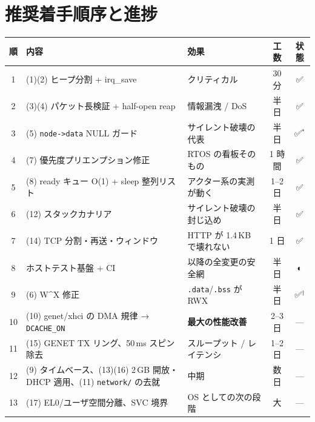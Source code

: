 \documentclass[a4paper,11pt]{ltjsarticle}
\begin{document}
\section{推奨着手順序と進捗}

\begin{center}\small
\begin{longtable}{@{}c p{7.2cm} p{3.0cm} c c@{}}
\toprule
\textbf{順} & \textbf{内容} & \textbf{効果} & \textbf{工数} & \textbf{状態}\\ \midrule
\endhead
1  & (1)(2) ヒープ分割 + irq\_save                       & クリティカル            & 30 分   & ✅\\
2  & (3)(4) パケット長検証 + half-open reap              & 情報漏洩 / DoS          & 半日    & ✅\\
3  & (5) \texttt{node->data} NULL ガード                 & サイレント破壊の代表    & 半日    & ✅$^{*}$\\
4  & (7) 優先度プリエンプション修正                      & RTOS の看板そのもの     & 1 時間  & ✅\\
5  & (8) ready キュー O(1) + sleep 整列リスト            & アクター系の実測が動く  & 1--2 日 & ✅\\
6  & (12) スタックカナリア                               & サイレント破壊の封じ込め& 半日    & ✅\\
7  & (14) TCP 分割・再送・ウィンドウ                     & HTTP が 1.4\,KB で壊れない & 1 日 & ✅\\
8  & ホストテスト基盤 + CI                               & 以降の全変更の安全網    & 半日    & ◐\\
9  & (6) W\textasciicircum X 修正                        & \texttt{.data}/\texttt{.bss} が RWX & 半日 & ✅$^{\dagger}$\\
10 & (10) genet/xhci の DMA 規律 → \texttt{DCACHE\_ON}   & \textbf{最大の性能改善} & 2--3 日 & ---\\
11 & (15) GENET TX リング、50\,ms スピン除去             & スループット / レイテンシ & 1--2 日 & ---\\
12 & (9) タイムベース、(13)(16) 2\,GB 開放・DHCP 適用、(11) \texttt{network/} の去就 & 中期 & 数日 & ---\\
13 & (17) EL0/ユーザ空間分離、SVC 境界                   & OS としての次の段階     & 大      & ---\\
\bottomrule
\end{longtable}
\end{center}
\end{document}
